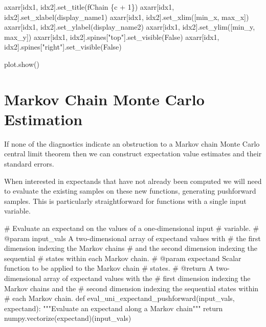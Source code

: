 \documentclass[
  letterpaper,
  DIV=11,
  numbers=noendperiod]{scrartcl}
\newenvironment{Shaded}{\begin{snugshade}}{\end{snugshade}}
\newcommand{\CommentTok}[1]{\textcolor[rgb]{0.37,0.37,0.37}{#1}}
\newcommand{\ControlFlowTok}[1]{\textcolor[rgb]{0.00,0.23,0.31}{#1}}
\newcommand{\DecValTok}[1]{\textcolor[rgb]{0.68,0.00,0.00}{#1}}
\newcommand{\KeywordTok}[1]{\textcolor[rgb]{0.00,0.23,0.31}{#1}}
\newcommand{\NormalTok}[1]{\textcolor[rgb]{0.00,0.23,0.31}{#1}}
\newcommand{\OperatorTok}[1]{\textcolor[rgb]{0.37,0.37,0.37}{#1}}
\newcommand{\SpecialCharTok}[1]{\textcolor[rgb]{0.37,0.37,0.37}{#1}}
\newcommand{\SpecialStringTok}[1]{\textcolor[rgb]{0.13,0.47,0.30}{#1}}
\newcommand{\StringTok}[1]{\textcolor[rgb]{0.13,0.47,0.30}{#1}}
\newcommand{\VariableTok}[1]{\textcolor[rgb]{0.07,0.07,0.07}{#1}}
\begin{document}
\begin{Shaded}
\begin{Highlighting}[]
\NormalTok{    axarr[idx1, idx2].set\_title(}\SpecialStringTok{f\textquotesingle{}Chain }\SpecialCharTok{\{}\NormalTok{c }\OperatorTok{+} \DecValTok{1}\SpecialCharTok{\}}\SpecialStringTok{\textquotesingle{}}\NormalTok{)}
\NormalTok{    axarr[idx1, idx2].set\_xlabel(display\_name1)}
\NormalTok{    axarr[idx1, idx2].set\_xlim([min\_x, max\_x])}
\NormalTok{    axarr[idx1, idx2].set\_ylabel(display\_name2)}
\NormalTok{    axarr[idx1, idx2].set\_ylim([min\_y, max\_y])}
\NormalTok{    axarr[idx1, idx2].spines[}\StringTok{"top"}\NormalTok{].set\_visible(}\VariableTok{False}\NormalTok{)}
\NormalTok{    axarr[idx1, idx2].spines[}\StringTok{"right"}\NormalTok{].set\_visible(}\VariableTok{False}\NormalTok{)}
  
\NormalTok{  plot.show()}
\end{Highlighting}
\end{Shaded}

\section{Markov Chain Monte Carlo
Estimation}\label{markov-chain-monte-carlo-estimation}

If none of the diagnostics indicate an obstruction to a Markov chain
Monte Carlo central limit theorem then we can construct expectation
value estimates and their standard errors.

When interested in expectands that have not already been computed we
will need to evaluate the existing samples on these new functions,
generating pushforward samples. This is particularly straightforward for
functions with a single input variable.

\begin{Shaded}
\begin{Highlighting}[]
\CommentTok{\# Evaluate an expectand on the values of a one{-}dimensional input}
\CommentTok{\# variable.}
\CommentTok{\# @param input\_vals A two{-}dimensional array of expectand values with}
\CommentTok{\#                   the first dimension indexing the Markov chains}
\CommentTok{\#                   and the second dimension indexing the sequential}
\CommentTok{\#                   states within each Markov chain.}
\CommentTok{\# @param expectand Scalar function to be applied to the Markov chain}
\CommentTok{\#                  states.}
\CommentTok{\# @return A two{-}dimensional array of expectand values with the}
\CommentTok{\#         first dimension indexing the Markov chains and the}
\CommentTok{\#         second dimension indexing the sequential states within}
\CommentTok{\#         each Markov chain.}
\KeywordTok{def}\NormalTok{ eval\_uni\_expectand\_pushforward(input\_vals, expectand):}
  \CommentTok{"""Evaluate an expectand along a Markov chain"""}
  \ControlFlowTok{return}\NormalTok{ numpy.vectorize(expectand)(input\_vals)}
\end{Highlighting}
\end{Shaded}
\end{document}
